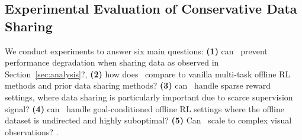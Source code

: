 \newcommand{\CC}{\cellcolor{Gray}}

\subsection{Experimental Evaluation of Conservative Data Sharing}
\label{sec:exp}

We conduct experiments to answer six main questions: \textbf{(1)} can \cdsmethodname\ prevent performance degradation when sharing data as observed in Section~\ref{sec:analysis}?, \textbf{(2)} how does \cdsmethodname\ compare to vanilla multi-task offline RL methods and prior data sharing methods?
\textbf{(3)} can \cdsmethodname\ handle sparse reward settings, where data sharing is particularly important due to scarce supervision signal? \textbf{(4)} can \cdsmethodname\ handle goal-conditioned offline RL settings where the offline dataset is undirected and highly suboptimal? \textbf{(5)} Can \cdsmethodname\ scale to complex visual observations? .

